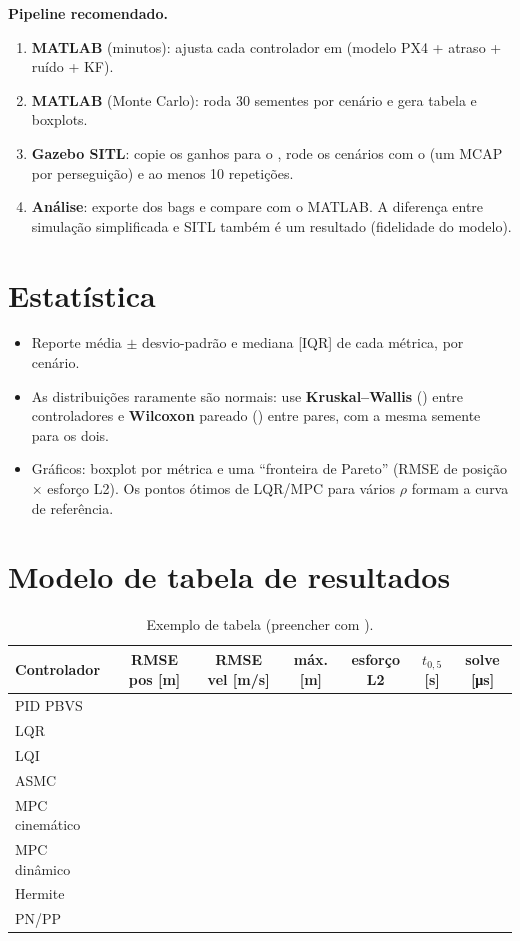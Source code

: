 \begin{receita}
\textbf{Pipeline recomendado.}
\begin{enumerate}
  \item \textbf{MATLAB} (minutos):  ajusta cada controlador em
         (modelo PX4 + atraso + ruído + KF).
  \item \textbf{MATLAB} (Monte Carlo):  roda 30
        sementes por cenário e gera tabela e boxplots.
  \item \textbf{Gazebo SITL}: copie os ganhos para o , rode os cenários com o
         (um MCAP por perseguição) e ao menos 10 repetições.
  \item \textbf{Análise}: exporte  dos bags e compare com o
        MATLAB. A diferença entre simulação simplificada e SITL também é um resultado
        (fidelidade do modelo).
\end{enumerate}
\end{receita}

\section{Estatística}
\begin{itemize}
  \item Reporte média $\pm$ desvio-padrão e mediana [IQR] de cada métrica, por cenário.
  \item As distribuições raramente são normais: use \textbf{Kruskal--Wallis}
        () entre controladores e \textbf{Wilcoxon} pareado
        () entre pares, com a mesma semente para os dois.
  \item Gráficos: boxplot por métrica e uma ``fronteira de Pareto'' (RMSE de posição
        $\times$ esforço L2). Os pontos ótimos de LQR/MPC para vários $\rho$ formam a
        curva de referência.
\end{itemize}

\section{Modelo de tabela de resultados}
\begin{table}[H]
\centering
\caption{Exemplo de tabela (preencher com ).}
\begin{tabular}{@{}lcccccc@{}}
\toprule
Controlador & RMSE pos [m] & RMSE vel [m/s] & máx. [m] & esforço L2 & $t_{0,5}$ [s] & solve [\si{\micro s}] \\
\midrule
PID PBVS & & & & & & \\
LQR & & & & & & \\
LQI & & & & & & \\
ASMC & & & & & & \\
MPC cinemático & & & & & & \\
MPC dinâmico & & & & & & \\
Hermite & & & & & & \\
PN/PP & & & & & & \\
\bottomrule
\end{tabular}
\end{table}

